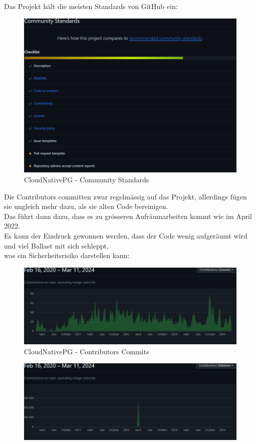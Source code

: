 \begin{flushleft}
    Das Projekt hält die meisten Standards von GitHub ein:
    \begin{figure}[H]
        \centering
        \includegraphics[width=0.75\linewidth]{source/implementation/evaluation/postgresql_ha_solutions/insights/cloudnativepg/community_standards}
        \caption{CloudNativePG - Community Standards}
        \label{fig:community_standards_cloudnativepg}
    \end{figure}
    Die Contributors committen zwar regelmässig auf das Projekt, allerdings fügen sie ungleich mehr dazu, als sie alten Code bereinigen.\\
    Das führt dann dazu, dass es zu grösseren Aufräumarbeiten kommt wie im April 2022.\\
    Es kann der Eindruck gewonnen werden, dass der Code wenig aufgeräumt wird und viel Ballast mit sich schleppt,\\
    was ein Sicherheitsrisiko darstellen kann:
    \begin{figure}[H]
        \centering
        \includegraphics[width=0.75\linewidth]{source/implementation/evaluation/postgresql_ha_solutions/insights/cloudnativepg/contributors_commits_cloudnative-pg_cloudnative-pg}
        \caption{CloudNativePG - Contributors Commits}
        \label{fig:contributors_commits_cloudnative-pg_cloudnative-pg}
    \end{figure}
    \begin{figure}[H]
        \centering
        \includegraphics[width=0.75\linewidth]{source/implementation/evaluation/postgresql_ha_solutions/insights/cloudnativepg/contributors_deletations_cloudnative-pg_cloudnative-pg}

\end{figure}
\end{flushleft}
